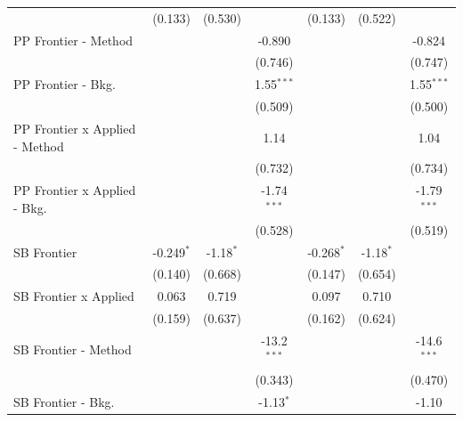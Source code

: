\begin{tabular}{lcccccc}
                                  & (0.133)       & (0.530)        &               & (0.133)       & (0.522)       &   \\   
   PP Frontier - Method           &               &                & -0.890        &               &               & -0.824\\   
                                  &               &                & (0.746)       &               &               & (0.747)\\   
   PP Frontier - Bkg.             &               &                & 1.55$^{***}$  &               &               & 1.55$^{***}$\\   
                                  &               &                & (0.509)       &               &               & (0.500)\\   
   PP Frontier x Applied - Method &               &                & 1.14          &               &               & 1.04\\   
                                  &               &                & (0.732)       &               &               & (0.734)\\   
   PP Frontier x Applied - Bkg.   &               &                & -1.74$^{***}$ &               &               & -1.79$^{***}$\\   
                                  &               &                & (0.528)       &               &               & (0.519)\\   
   SB Frontier                    & -0.249$^{*}$  & -1.18$^{*}$    &               & -0.268$^{*}$  & -1.18$^{*}$   &   \\   
                                  & (0.140)       & (0.668)        &               & (0.147)       & (0.654)       &   \\   
   SB Frontier x Applied          & 0.063         & 0.719          &               & 0.097         & 0.710         &   \\   
                                  & (0.159)       & (0.637)        &               & (0.162)       & (0.624)       &   \\   
   SB Frontier - Method           &               &                & -13.2$^{***}$ &               &               & -14.6$^{***}$\\   
                                  &               &                & (0.343)       &               &               & (0.470)\\   
   SB Frontier - Bkg.             &               &                & -1.13$^{*}$   &               &               & -1.10\\   

\end{tabular}
